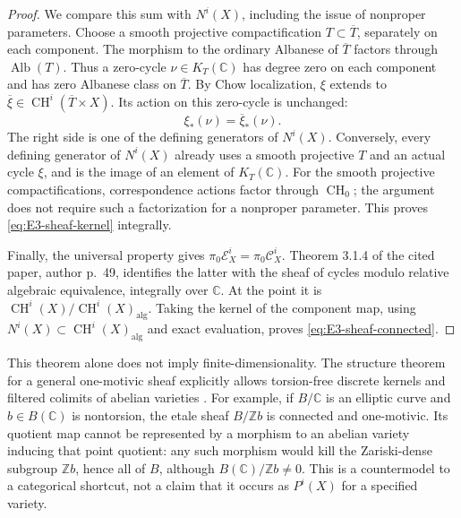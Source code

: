 \begin{proof}
We compare this sum with $N^i(X)$, including the issue of
nonproper parameters. Choose a smooth projective
compactification $T\subset\overline T$, separately on
each component. The morphism to the ordinary Albanese of
$\overline T$ factors through $\operatorname{Alb}(T)$.
Thus a zero-cycle $\nu\in K_T(\mathbb C)$ has degree zero
on each component and has zero Albanese class on
$\overline T$. By Chow localization, $\xi$ extends to
$\overline\xi\in\operatorname{CH}^i(\overline T\times X)$.
Its action on this zero-cycle is unchanged:
\[
                       \xi_*(\nu)=\overline\xi_*(\nu).
\]
The right side is one of the defining generators of
$N^i(X)$. Conversely, every defining generator of $N^i(X)$
already uses a smooth projective $T$ and an actual cycle
$\xi$, and is the image of an element of $K_T(\mathbb C)$.
For the smooth projective compactifications,
correspondence actions factor through $\operatorname{CH}_0$;
the argument does not require such a factorization for a
nonproper parameter. This proves
\eqref{eq:E3-sheaf-kernel} integrally.

Finally, the universal property gives
$\pi_0\mathcal E_X^i=\pi_0\mathcal C_X^i$.
Theorem 3.1.4 of the cited paper, author p.~49, identifies
the latter with the sheaf of cycles modulo relative
algebraic equivalence, integrally over $\mathbb C$.
At the point it is
$\operatorname{CH}^i(X)/\operatorname{CH}^i(X)_{\mathrm{alg}}$.
Taking the kernel of the component map, using
$N^i(X)\subset\operatorname{CH}^i(X)_{\mathrm{alg}}$ and
exact evaluation, proves \eqref{eq:E3-sheaf-connected}.
\end{proof}

This theorem alone does not imply finite-dimensionality. The
structure theorem for a general one-motivic sheaf explicitly
allows torsion-free discrete kernels and filtered colimits
of abelian varieties
\citep[Theorem 1.3.10, author p.~23]{cyAyoubBarbieriViale2009}.
For example, if $B/\mathbb C$ is an elliptic curve and
$b\in B(\mathbb C)$ is nontorsion, the etale sheaf
$B/\mathbb Z b$ is connected and one-motivic. Its quotient
map cannot be represented by a morphism to an abelian
variety inducing that point quotient: any such morphism
would kill the Zariski-dense subgroup $\mathbb Zb$, hence
all of $B$, although $B(\mathbb C)/\mathbb Zb\ne0$.
This is a countermodel to a categorical shortcut, not a
claim that it occurs as $P^i(X)$ for a specified variety.

